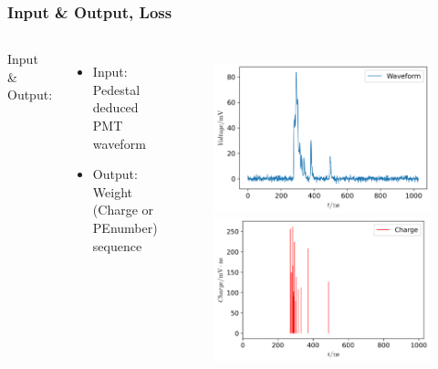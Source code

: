 \documentclass{beamer}
\begin{document}
\begin{frame}
\frametitle{Input \& Output, Loss}
\begin{columns}
\hspace{4mm}Input \& Output:
\begin{itemize}
    \item Input: Pedestal deduced PMT waveform
    \item Output: Weight (Charge or PEnumber) sequence
\end{itemize}
\setlength{\abovecaptionskip}{-2mm}
\setlength{\belowcaptionskip}{0mm}
\begin{figure}
    \centering
    \includegraphics[width=0.9\linewidth]{img/wave.png}
    \includegraphics[width=0.9\linewidth]{img/charge.png}
\end{figure}
\end{columns}
\end{frame}
\end{document}
